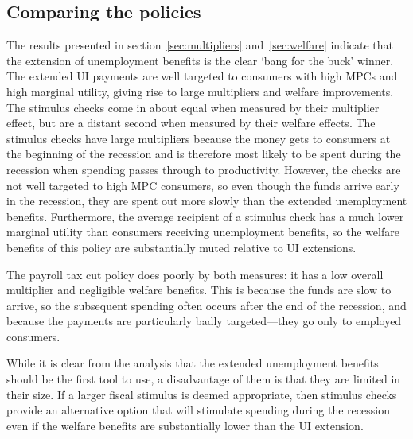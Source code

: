 \documentclass[../HAFiscal]{subfiles}
\begin{document}
\subsection{Comparing the policies} 

The results presented in section~\ref{sec:multipliers} and~\ref{sec:welfare} indicate that the extension of unemployment benefits is the clear `bang for the buck' winner. The extended UI payments are well targeted to consumers with high MPCs and high marginal utility, giving rise to large multipliers and welfare improvements. The stimulus checks come in about equal when measured by their multiplier effect, but are a distant second when measured by their welfare effects. The stimulus checks have large multipliers because the money gets to consumers at the beginning of the recession and is therefore most likely to be spent during the recession when spending passes through to productivity.  However, the checks are not well targeted to high MPC consumers, so even though the funds arrive early in the recession, they are spent out more slowly than the extended unemployment benefits. Furthermore, the average recipient of a stimulus check has a much lower marginal utility than consumers receiving unemployment benefits, so the welfare benefits of this policy are substantially muted relative to UI extensions.

The payroll tax cut policy does poorly by both measures: it has a low overall multiplier and negligible welfare benefits. This is because the funds are slow to arrive, so the subsequent spending often occurs after the end of the recession, and because the payments are particularly badly targeted---they go only to employed consumers.

While it is clear from the analysis that the extended unemployment benefits should be the first tool to use, a disadvantage of them is that they are limited in their size. If a larger fiscal stimulus is deemed appropriate, then stimulus checks provide an alternative option that will stimulate spending during the recession even if the welfare benefits are substantially lower than the UI extension.
\end{document}
